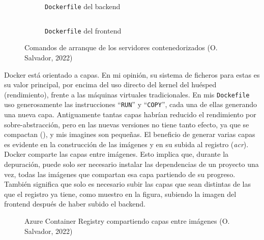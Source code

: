 \documentclass[11pt]{article}
\begin{document}
\begin{flushleft}
		\begin{figure}[htb]
			\centering
			\begin{subfigure}{0.3\textwidth}
				\inputminted[fontsize=\scriptsize, firstline=21, lastline=22, linenos, frame=single, breaklines]{dockerfile}{../../backend/Dockerfile}
			\caption{\texttt{Dockerfile} del backend}
			\end{subfigure}
			\hspace{1.5cm}
			\begin{subfigure}{0.5\textwidth}
				\inputminted[fontsize=\scriptsize, firstline=36, lastline=37, linenos, frame=single, breaklines]{dockerfile}{../../frontend/Dockerfile}
			\caption{\texttt{Dockerfile} del frontend}
			\end{subfigure}

			\caption{Comandos de arranque de los servidores contenedorizados (O. Salvador, 2022)}
		\end{figure}

	\clearpage
	Docker está orientado a capas. En mi opinión, su sistema de ficheros para estas es su valor principal, por encima del uso directo del kernel del huésped (rendimiento), frente a las máquinas virtuales tradicionales. En mis \texttt{Dockefile} uso generosamente las instrucciones ``\texttt{RUN}'' y ``\texttt{COPY}'', cada una de ellas generando una nueva capa. Antiguamente tantas capas habrían reducido el rendimiento por sobre-abstracción, pero en las nuevas versiones no tiene tanto efecto, ya que se compactan (\cite{docker_layers}), y mis imagines son pequeñas. El beneficio de generar varias capas es evidente en la construcción de las imágenes y en su subida al registro (\textit{\acrshort{acr}}). Docker comparte las capas entre imágenes. Esto implica que, durante la depuración, puede solo ser necesario instalar las dependencias de un proyecto una vez, todas las imágenes que compartan esa capa partiendo de su progreso. También significa que solo es necesario subir las capas que sean distintas de las que el registro ya tiene, como muestro en la figura, subiendo la imagen del frontend después de haber subido el backend. 
	\linebreak
	
	\begin{figure}[htb]
		\centering
		\caption{Azure Container Registry compartiendo capas entre imágenes (O. Salvador, 2022)}
        \label{shared_layers}
	\end{figure}
	

\end{flushleft}
\end{document}
